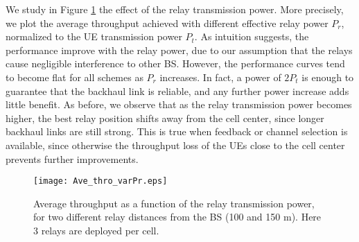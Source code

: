 \documentclass[12pt, letterpaper, onecolumn, draftcls]{IEEEtran}
\newcommand{\figw}{0.55\columnwidth}
\begin{document}
We study in Figure \ref{fig:Ave_thro_varPr} the effect of the relay transmission power. More precisely, we plot the average throughput achieved with different effective relay power $P_r$, normalized to the UE transmission power $P_t$.
As intuition suggests, the performance improve with the relay power, due to our assumption that the relays cause negligible interference to other BS. However, the performance curves tend to become flat for all schemes as $P_r$ increases. In fact, a power of $2P_t$ is enough to guarantee that the backhaul link is reliable, and any further power increase adds little benefit.
As before, we observe that as the relay transmission power becomes higher, the best relay position shifts away from the cell center, since longer backhaul links are still strong. This is true when feedback or channel selection is available, since otherwise the throughput loss of the UEs close to the cell center prevents further improvements.
\begin{figure}
    \centering
    \texttt{[image: Ave\_thro\_varPr.eps]}
     \caption{\small Average throughput as a function of the relay transmission power, for two different relay distances from the BS (100 and 150 m). Here 3 relays are deployed per cell.}
     \vspace{-1cm}
  \label{fig:Ave_thro_varPr}
\end{figure}
\end{document}
